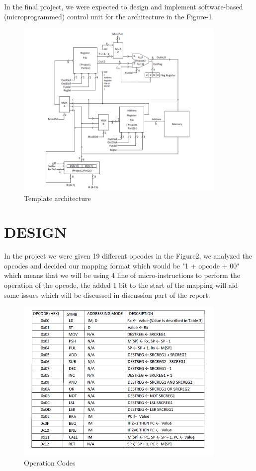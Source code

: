 \documentclass[pdftex,12pt,a4paper]{article}
\begin{document}
In the final project, we were expected to design and implement software-based (microprogrammed) control unit for the architecture in the Figure-1.

\begin{figure}[h]
    	\centering
    	\includegraphics[width=0.9\textwidth]{template.png}	
    	\caption{Template architecture}
    	\label{temp arch}
\end{figure}

\setcounter{page}{1}

\section{DESIGN}
In the project we were given 19 different opcodes in the Figure2, we analyzed the opcodes and decided our mapping format which would be "1 + opcode + 00" which means that we will be using 4 line of micro-instructions to perform the operation of the opcode, the added 1 bit to the start of the mapping will aid some issues which will be discussed in discussion part of the report. 

\begin{figure}[H]
    	\centering
    	\includegraphics[width=0.9\textwidth]{table1.png}	
    	\caption{Operation Codes}
    	\label{opcodes table}
\end{figure}
\end{document}
